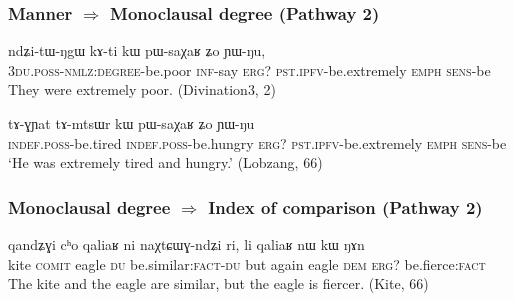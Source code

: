 \documentclass[xcolor=table]{beamer}
\newcommand{\ipa}[1]{{\phon \mbox{#1}}} %
\begin{document}
  \begin{frame} 
 \frametitle{Manner  $\Rightarrow$ Monoclausal degree (Pathway 2)}  
  

           \begin{exe}
  \ex  \label{ex:kW.pWsaXaR2}  
  \gll 
  \ipa{ndʑi-tɯ-ŋgɯ}  	\ipa{kɤ-ti}  	\ipa{kɯ}  	\ipa{pɯ-saχaʁ}  	\ipa{ʑo}  	\ipa{ɲɯ-ŋu,}  \\
  \textsc{3du.poss-nmlz:degree}-be.poor \textsc{inf}-say \textsc{erg?} \textsc{pst.ipfv}-be.extremely \textsc{emph} \textsc{sens}-be \\
  \glt They were extremely poor. (Divination3, 2)
   \end{exe}   
   
   
         \begin{exe}
  \ex  \label{ex:kW.pWsaXaR}  
  \gll 
   \ipa{tɤ-ɣɲat}  	\ipa{tɤ-mtsɯr}  	\ipa{kɯ}  	\ipa{pɯ-saχaʁ}  	\ipa{ʑo}  	\ipa{ɲɯ-ŋu}  \\
      \textsc{indef.poss}-be.tired     \textsc{indef.poss}-be.hungry \textsc{erg?} \textsc{pst.ipfv}-be.extremely \textsc{emph} \textsc{sens}-be \\ 
      \glt `He was extremely tired and hungry.' (Lobzang, 66)
   \end{exe}   
  
  \end{frame}     
   
    \begin{frame} 
 \frametitle{Monoclausal degree $\Rightarrow$ Index of comparison (Pathway 2)}  

 \begin{exe}
  \ex  \label{ex:kW.NAn}  
  \gll 
\ipa{qandʑɣi}  	\ipa{cʰo}  	\ipa{qaliaʁ}  	\ipa{ni}  	\ipa{naχtɕɯɣ-ndʑi}  	\ipa{ri,}  	\ipa{li}  	\ipa{qaliaʁ}  	\ipa{nɯ}  	\ipa{kɯ}  	\ipa{ŋɤn}     \\
kite \textsc{comit} eagle \textsc{du} be.similar:\textsc{fact}-\textsc{du} but again eagle \textsc{dem} \textsc{erg}? be.fierce:\textsc{fact} \\
\glt The kite and the eagle are similar, but the eagle is fiercer. (Kite, 66)
     \end{exe}   
  \end{frame}     
  
\end{document}
